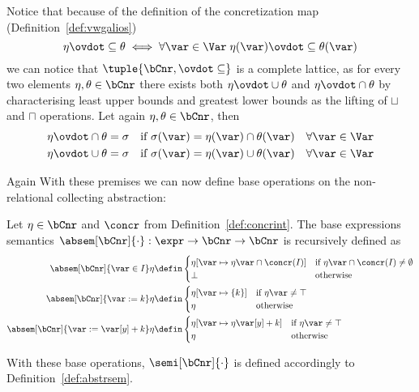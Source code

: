 Notice that because of the definition of the concretization map
(Definition~\ref{def:vwgalios})
\begin{equation*}
  \eta \ovdot\subseteq \theta \iff \forall \var \in \Var \; \eta(\var) \ovdot\subseteq \theta(\var)
\end{equation*}
we can notice that \(\tuple{\bCnr, \ovdot\subseteq}\) is a complete
lattice, as for every two elements \(\eta,\theta\in\bCnr\) there
exists both \(\eta \ovdot\cup \theta\) and \(\eta \ovdot\cap \theta\)
by characterising least upper bounds and greatest lower bounds as the
lifting of \(\sqcup\) and \(\sqcap\) operations. Let again
\(\eta, \theta \in \bCnr\), then
\begin{align*}
  \eta \ovdot\cap \theta = \sigma & \quad \text{if } \sigma(\var) = \eta(\var) \cap \theta(\var) \quad \forall \var\in\Var \\
  \eta \ovdot\cup \theta = \sigma & \quad \text{if } \sigma(\var) = \eta(\var) \cup \theta(\var) \quad \forall \var\in\Var
\end{align*}

Again With these premises we can now define base
operations on the non-relational collecting abstraction:
\begin{definition}
  Let \(\eta \in \bCnr\) and \(\concr\) from
  Definition~\ref{def:concrint}. The base expressions semantics
  \(\absem[\bCnr]{\cdot} : \expr \to \bCnr \to \bCnr\) is recursively
  defined as
  \begin{align*}
    \absem[\bCnr]{\var\in I}\eta & \defin
                                   \begin{cases}
                                     \eta[\var\mapsto\eta\var\cap \concr(I)] & \text{if } \eta\var\cap \concr(I) \neq \emptyset \\
                                     \bot & \text{otherwise}
                                   \end{cases} \\
    \absem[\bCnr]{\var := k}\eta & \defin
                                   \begin{cases}
                                     \eta[\var\mapsto\{k\}] & \text{if } \eta\var\neq\top \\
                                     \eta & \text{otherwise}
                                   \end{cases} \\
    \absem[\bCnr]{\var := \var[y] + k}\eta & \defin
                                             \begin{cases}
                                               \eta[\var\mapsto\eta\var[y] + k] & \text{if } \eta\var\neq\top \\
                                               \eta & \text{otherwise}
                                             \end{cases}
  \end{align*}
\end{definition}
With these base operations, \(\semi[\bCnr]{\cdot}\) is defined
accordingly to Definition~\ref{def:abstrsem}.
